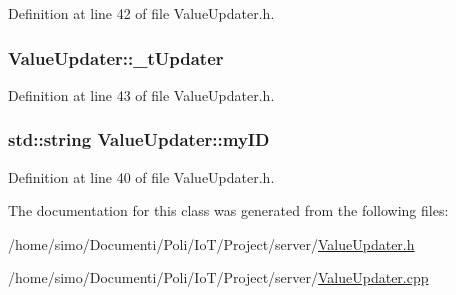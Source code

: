 Definition at line 42 of file Value\+Updater.\+h.

\hypertarget{class_value_updater_a1ee7b4c634b4511dc14b64b6fbdf4294}{
\subsubsection[{\+\_\+t\+Updater}]{ Value\+Updater\+::\+\_\+t\+Updater\hspace{0.3cm}{\ttfamily [protected]}}}\label{class_value_updater_a1ee7b4c634b4511dc14b64b6fbdf4294}


Definition at line 43 of file Value\+Updater.\+h.

\hypertarget{class_value_updater_a5fb457df5b7c1546c77815e7ed3cf051}{
\subsubsection[{my\+I\+D}]{\setlength{\rightskip}{0pt plus 5cm}std\+::string Value\+Updater\+::my\+I\+D\hspace{0.3cm}{\ttfamily [protected]}}}\label{class_value_updater_a5fb457df5b7c1546c77815e7ed3cf051}


Definition at line 40 of file Value\+Updater.\+h.



The documentation for this class was generated from the following files\+:\begin{DoxyCompactItemize}
\item 
/home/simo/\+Documenti/\+Poli/\+Io\+T/\+Project/server/\hyperlink{_value_updater_8h}{Value\+Updater.\+h}\item 
/home/simo/\+Documenti/\+Poli/\+Io\+T/\+Project/server/\hyperlink{_value_updater_8cpp}{Value\+Updater.\+cpp}\end{DoxyCompactItemize}
